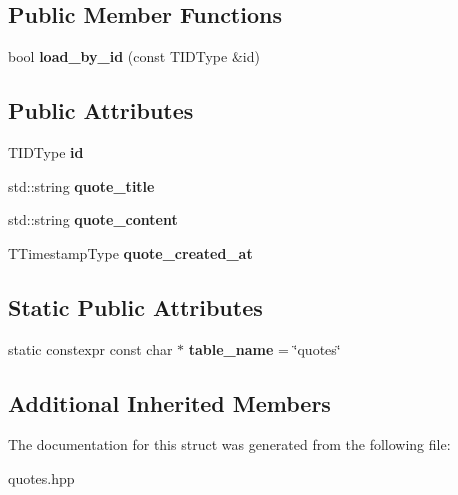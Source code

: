 \subsection*{Public Member Functions}
\begin{DoxyCompactItemize}
\item 
\mbox{\label{structmods_1_1orm_1_1base__quotes_a1e3f59a7b0d3e7fc6b0dccc8884dec27}} 
bool {\bfseries load\+\_\+by\+\_\+id} (const T\+I\+D\+Type \&id)
\end{DoxyCompactItemize}
\subsection*{Public Attributes}
\begin{DoxyCompactItemize}
\item 
\mbox{\label{structmods_1_1orm_1_1base__quotes_a9a2df0edb32ee82916989c4e879835c9}} 
T\+I\+D\+Type {\bfseries id}
\item 
\mbox{\label{structmods_1_1orm_1_1base__quotes_a70586f9180a43d8ebd1a61395422ae3e}} 
std\+::string {\bfseries quote\+\_\+title}
\item 
\mbox{\label{structmods_1_1orm_1_1base__quotes_ab994c968a56e1fe996b01d82c989fb34}} 
std\+::string {\bfseries quote\+\_\+content}
\item 
\mbox{\label{structmods_1_1orm_1_1base__quotes_a567a5349410ed1266e3c4657002d454a}} 
T\+Timestamp\+Type {\bfseries quote\+\_\+created\+\_\+at}
\end{DoxyCompactItemize}
\subsection*{Static Public Attributes}
\begin{DoxyCompactItemize}
\item 
\mbox{\label{structmods_1_1orm_1_1base__quotes_a21c31ffaa906ff2fd8788cd9f7a3ea7a}} 
static constexpr const char $\ast$ {\bfseries table\+\_\+name} = \char`\"{}quotes\char`\"{}
\end{DoxyCompactItemize}
\subsection*{Additional Inherited Members}


The documentation for this struct was generated from the following file\+:\begin{DoxyCompactItemize}
\item 
quotes.\+hpp\end{DoxyCompactItemize}
